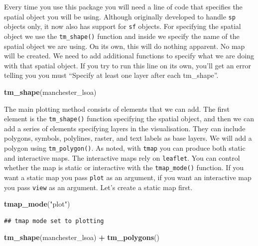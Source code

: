 \documentclass[]{book}
\newenvironment{Shaded}{\begin{snugshade}}{\end{snugshade}}
\newcommand{\KeywordTok}[1]{\textcolor[rgb]{0.13,0.29,0.53}{\textbf{#1}}}
\newcommand{\NormalTok}[1]{#1}
\newcommand{\OperatorTok}[1]{\textcolor[rgb]{0.81,0.36,0.00}{\textbf{#1}}}
\newcommand{\StringTok}[1]{\textcolor[rgb]{0.31,0.60,0.02}{#1}}
\begin{document}
Every time you use this package you will need a line of code that specifies the spatial object you will be using. Although originally developed to handle \texttt{sp} objects only, it now also has support for \texttt{sf} objects. For specifying the spatial object we use the \texttt{tm\_shape()} function and inside we specify the name of the spatial object we are using. On its own, this will do nothing apparent. No map will be created. We need to add additional functions to specify what we are doing with that spatial object. If you try to run this line on its own, you'll get an error telling you you must ``Specify at least one layer after each tm\_shape''.

\begin{Shaded}
\begin{Highlighting}[]
\KeywordTok{tm_shape}\NormalTok{(manchester_lsoa)}
\end{Highlighting}
\end{Shaded}

The main plotting method consists of elements that we can add. The first element is the \texttt{tm\_shape()} function specifying the spatial object, and then we can add a series of elements specifying layers in the visualisation. They can include polygons, symbols, polylines, raster, and text labels as base layers. We will add a polygon using \texttt{tm\_polygon()}. As noted, with \texttt{tmap} you can produce both static and interactive maps. The interactive maps rely on \texttt{leaflet}. You can control whether the map is static or interactive with the \texttt{tmap\_mode()} function. If you want a static map you pass \texttt{plot} as an argument, if you want an interactive map you pass \texttt{view} as an argument. Let's create a static map first.

\begin{Shaded}
\begin{Highlighting}[]
\KeywordTok{tmap_mode}\NormalTok{(}\StringTok{"plot"}\NormalTok{)}
\end{Highlighting}
\end{Shaded}

\begin{verbatim}
## tmap mode set to plotting
\end{verbatim}

\begin{Shaded}
\begin{Highlighting}[]
\KeywordTok{tm_shape}\NormalTok{(manchester_lsoa) }\OperatorTok{+}\StringTok{ }
\StringTok{  }\KeywordTok{tm_polygons}\NormalTok{()}
\end{Highlighting}
\end{Shaded}
\end{document}

